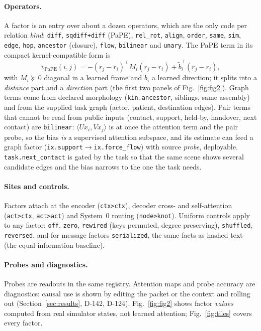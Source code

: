 \documentclass[10pt,twocolumn]{article}
\newcommand{\code}[1]{\texttt{\small #1}}
\begin{document}
\paragraph{Operators.} A factor is an entry over about a dozen operators, which are the only code per relation \emph{kind}: \code{diff}, \code{sqdiff+diff} (PaPE), \code{rel\_rot}, \code{align}, \code{order}, \code{same}, \code{sim}, \code{edge}, \code{hop}, \code{ancestor} (closure), \code{flow}, \code{bilinear} and \code{unary}. The PaPE term in its compact kernel-compatible form is
\begin{equation}
v_{\mathrm{PaPE}}(i,j)=-(r_j-r_i)^{\top}M_i(r_j-r_i)+\tilde b_i^{\top}(r_j-r_i),
\label{eq:pape}
\end{equation}
with $M_i\succeq0$ diagonal in a learned frame and $\tilde b_i$ a learned direction; it splits into a \emph{distance} part and a \emph{direction} part (the first two panels of Fig.~\ref{fig:fig2}). Graph terms come from declared morphology (\code{kin.ancestor}, siblings, same assembly) and from the supplied task graph (actor, patient, destination edges). Pair terms that cannot be read from public inputs (contact, support, held-by, handover, next contact) are \code{bilinear}: $\langle U x_i,Vx_j\rangle$ is at once the attention term and the pair probe, so the bias \emph{is} a supervised attention subspace, and its estimate can feed a graph factor (\code{ix.support}$\to$\code{ix.force\_flow}) with source \emph{probe}, deployable. \code{task.next\_contact} is gated by the task so that the same scene shows several candidate edges and the bias narrows to the one the task needs.

\paragraph{Sites and controls.} Factors attach at the encoder (\code{ctx>ctx}), decoder cross- and self-attention (\code{act>ctx}, \code{act>act}) and System~0 routing (\code{node>knot}). Uniform controls apply to any factor: \code{off}, \code{zero}, \code{rewired} (keys permuted, degree preserving), \code{shuffled}, \code{reversed}, and for message factors \code{serialized}, the same facts as hashed text (the equal-information baseline).

\paragraph{Probes and diagnostics.} Probes are readouts in the same registry. Attention maps and probe accuracy are diagnostics: causal use is shown by editing the packet or the context and rolling out (Section~\ref{sec:results}, D-142, D-124). Fig.~\ref{fig:fig2} shows factor \emph{values} computed from real simulator states, not learned attention; Fig.~\ref{fig:tiles} covers every factor.
\end{document}

